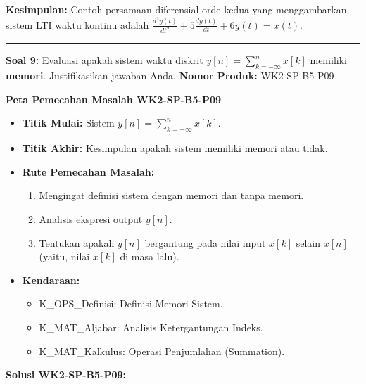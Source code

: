 \documentclass[
  letterpaper,
  DIV=11,
  numbers=noendperiod]{scrreprt}
\providecommand{\tightlist}{%
  \setlength{\itemsep}{0pt}\setlength{\parskip}{0pt}}
\begin{document}
\textbf{Kesimpulan:} Contoh persamaan diferensial orde kedua yang
menggambarkan sistem LTI waktu kontinu adalah
\textbf{\(\frac{d^2 y(t)}{dt^2} + 5 \frac{dy(t)}{dt} + 6 y(t) = x(t)\)}.

\begin{center}\rule{0.5\linewidth}{0.5pt}\end{center}

\textbf{Soal 9:} Evaluasi apakah sistem waktu diskrit
\(y[n] = \sum_{k=-\infty}^{n} x[k]\) memiliki \textbf{memori}.
Justifikasikan jawaban Anda. \textbf{Nomor Produk:} WK2-SP-B5-P09

\textbf{Peta Pemecahan Masalah WK2-SP-B5-P09}

\begin{itemize}
\tightlist
\item
  \textbf{Titik Mulai:} Sistem \(y[n] = \sum_{k=-\infty}^{n} x[k]\).
\item
  \textbf{Titik Akhir:} Kesimpulan apakah sistem memiliki memori atau
  tidak.
\item
  \textbf{Rute Pemecahan Masalah:}

  \begin{enumerate}
  \def\labelenumi{\arabic{enumi}.}
  \tightlist
  \item
    Mengingat definisi sistem dengan memori dan tanpa memori.
  \item
    Analisis ekspresi output \(y[n]\).
  \item
    Tentukan apakah \(y[n]\) bergantung pada nilai input \(x[k]\) selain
    \(x[n]\) (yaitu, nilai \(x[k]\) di masa lalu).
  \end{enumerate}
\item
  \textbf{Kendaraan:}

  \begin{itemize}
  \tightlist
  \item
    K\_OPS\_Definisi: Definisi Memori Sistem.
  \item
    K\_MAT\_Aljabar: Analisis Ketergantungan Indeks.
  \item
    K\_MAT\_Kalkulus: Operasi Penjumlahan (Summation).
  \end{itemize}
\end{itemize}

\textbf{Solusi WK2-SP-B5-P09:}
\end{document}
